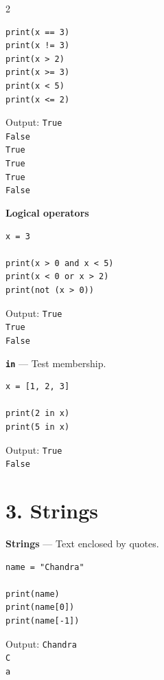 \documentclass[10pt,a4paper]{article}
\begin{document}
\begin{multicols}{2}
\begin{card}
\begin{lstlisting}[style=pythonstyle]
print(x == 3)
print(x != 3)
print(x > 2)
print(x >= 3)
print(x < 5)
print(x <= 2)
\end{lstlisting}

Output:
\texttt{True}\\
\texttt{False}\\
\texttt{True}\\
\texttt{True}\\
\texttt{True}\\
\texttt{False}
\end{card}

\begin{card}
\textbf{Logical operators}

\begin{lstlisting}[style=pythonstyle]
x = 3

print(x > 0 and x < 5)
print(x < 0 or x > 2)
print(not (x > 0))
\end{lstlisting}

Output:
\texttt{True}\\
\texttt{True}\\
\texttt{False}
\end{card}

\begin{card}
\textbf{\texttt{in}} --- Test membership.

\begin{lstlisting}[style=pythonstyle]
x = [1, 2, 3]

print(2 in x)
print(5 in x)
\end{lstlisting}

Output:
\texttt{True}\\
\texttt{False}
\end{card}

\section*{3. Strings}

\begin{card}
\textbf{Strings} --- Text enclosed by quotes.

\begin{lstlisting}[style=pythonstyle]
name = "Chandra"

print(name)
print(name[0])
print(name[-1])
\end{lstlisting}

Output:
\texttt{Chandra}\\
\texttt{C}\\
\texttt{a}
\end{card}


\end{multicols}
\end{document}

